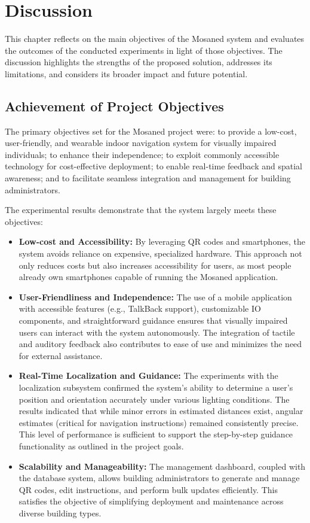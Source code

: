 

\section{Discussion}

This chapter reflects on the main objectives of the Mosaned system and evaluates the outcomes of the conducted experiments in light of those objectives. The discussion highlights the strengths of the proposed solution, addresses its limitations, and considers its broader impact and future potential.

\subsection{Achievement of Project Objectives}

The primary objectives set for the Mosaned project were: to provide a low-cost, user-friendly, and wearable indoor navigation system for visually impaired individuals; to enhance their independence; to exploit commonly accessible technology for cost-effective deployment; to enable real-time feedback and spatial awareness; and to facilitate seamless integration and management for building administrators.

The experimental results demonstrate that the system largely meets these objectives:

\begin{itemize}
	\item \textbf{Low-cost and Accessibility:} By leveraging QR codes and smartphones, the system avoids reliance on expensive, specialized hardware. This approach not only reduces costs but also increases accessibility for users, as most people already own smartphones capable of running the Mosaned application.
	\item \textbf{User-Friendliness and Independence:} The use of a mobile application with accessible features (e.g., TalkBack support), customizable IO components, and straightforward guidance ensures that visually impaired users can interact with the system autonomously. The integration of tactile and auditory feedback also contributes to ease of use and minimizes the need for external assistance.
	\item \textbf{Real-Time Localization and Guidance:} The experiments with the localization subsystem confirmed the system’s ability to determine a user’s position and orientation accurately under various lighting conditions. The results indicated that while minor errors in estimated distances exist, angular estimates (critical for navigation instructions) remained consistently precise. This level of performance is sufficient to support the step-by-step guidance functionality as outlined in the project goals.
	\item \textbf{Scalability and Manageability:} The management dashboard, coupled with the database system, allows building administrators to generate and manage QR codes, edit instructions, and perform bulk updates efficiently. This satisfies the objective of simplifying deployment and maintenance across diverse building types.
\end{itemize}

